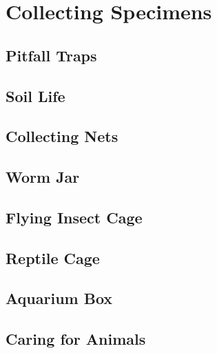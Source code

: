 \chapter{Collecting Specimens} %


\section{Pitfall Traps}


\section{Soil Life}


\section{Collecting Nets}


\section{Worm Jar}


\section{Flying Insect Cage}


\section{Reptile Cage}


\section{Aquarium Box}


\section{Caring for Animals}